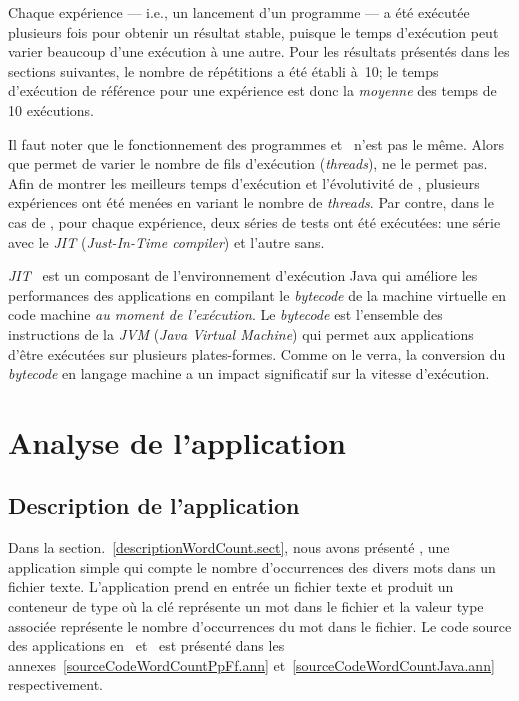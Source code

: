 Chaque exp\'erience --- i.e., un lancement d'un programme --- a \'et\'e ex\'ecut\'ee plusieurs fois pour obtenir un r\'esultat stable, puisque le temps d'ex\'ecution peut varier beaucoup d'une ex\'ecution \`a une autre. 
%
Pour les r\'esultats pr\'esent\'es dans les sections suivantes, le nombre de r\'ep\'etitions a \'et\'e \'etabli \`a~10; le temps d'ex\'ecution de r\'ef\'erence pour une exp\'erience est donc la \emph{moyenne} des temps de 10 ex\'ecutions.




Il faut noter que le fonctionnement des programmes  et~ n'est pas le m\^eme. Alors que  permet de varier le nombre de fils d'ex\'ecution (\emph{threads}),  ne le permet pas. Afin de montrer les meilleurs temps d'ex\'ecution et l'\'evolutivit\'e de , plusieurs exp\'eriences ont \'et\'e men\'ees en variant le nombre de \emph{threads}. Par contre, dans le cas de , pour chaque exp\'erience, deux s\'eries de tests ont \'et\'e ex\'ecut\'ees: une s\'erie avec le \emph{JIT} (\emph{Just-In-Time compiler}) et l'autre sans.

\label{jitDescription.sect}
\emph{JIT}~\citep{cramer1997compiling} est un composant de l'environnement d'ex\'ecution Java qui am\'eliore les performances des applications en compilant le \emph{bytecode} de la machine virtuelle en code machine \emph{au moment de l'ex\'ecution}. Le \emph{bytecode} est l'ensemble des instructions de la \emph{JVM} (\emph{Java Virtual Machine}) qui permet aux applications d'\^etre ex\'ecut\'ees sur plusieurs plates-formes. Comme on le verra, la conversion du \emph{bytecode} en langage machine a un impact significatif sur la vitesse d'ex\'ecution.



\section{Analyse de l'application }
\label{wordcount.sect}



\subsection{Description de l'application }


Dans la section.~\ref{descriptionWordCount.sect}, nous avons pr\'esent\'e , une application simple qui compte le nombre d'occurrences des divers mots dans un fichier texte. L'application prend en entr\'ee un fichier texte et produit un conteneur de type  où la cl\'e repr\'esente un mot dans le fichier et la valeur  type   associ\'ee repr\'esente le nombre d'occurrences du mot dans le fichier. Le code source des applications  en~ et~ est pr\'esent\'e dans les annexes~\ref{sourceCodeWordCountPpFf.ann} et~\ref{sourceCodeWordCountJava.ann} respectivement.


